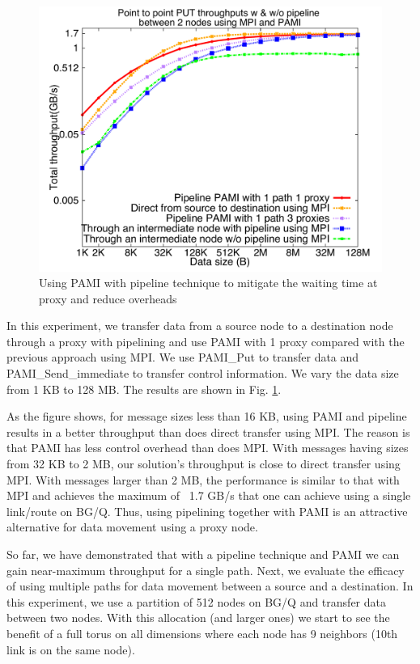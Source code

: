 \documentclass[final,5p,times]{elsarticle}
\begin{document}
\begin{figure}[!htb]
\centering
\includegraphics[scale=0.3]{pipeline_pami.pdf}
\caption{Using PAMI with pipeline technique to mitigate the waiting time at proxy and reduce overheads}
\label{fig:pipeline_pami}
\end{figure}

In this experiment, we transfer data from a source node to a destination node through a proxy with pipelining  and use PAMI with 1 proxy compared with the previous approach using MPI. We use PAMI\_Put to transfer data and PAMI\_Send\_immediate to transfer control information. We vary the data size from 1 KB to 128 MB. The results are shown in Fig. \ref{fig:pipeline_pami}.

As the figure shows, for message sizes less than 16 KB, using PAMI and pipeline results in a better throughput than does direct transfer using MPI. The reason is that PAMI has less control overhead than does MPI. With messages having sizes from 32 KB to 2 MB, our solution's throughput is close to direct transfer using MPI. With messages larger than 2 MB, the performance is similar to that with MPI and achieves the maximum of ~1.7 GB/s that one can achieve using a single link/route on BG/Q. Thus, using pipelining together with PAMI is an attractive alternative for data movement using a proxy node.

So far, we have demonstrated that with a pipeline technique and PAMI we can gain near-maximum throughput for a single path. Next, we evaluate the efficacy of using multiple paths for data movement between a source and a destination. In this experiment, we use a partition of 512 nodes on BG/Q and transfer data between two nodes.  With this allocation (and larger ones) we start to see the benefit of a full torus on all dimensions where each node has 9 neighbors (10th link is on the same node). 
\end{document}

